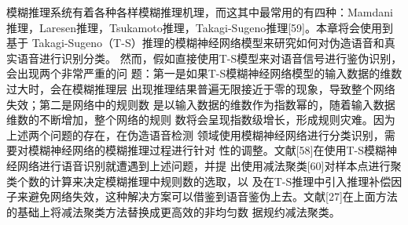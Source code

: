 \documentclass[12pt, a4paper]{article}
\begin{document}
模糊推理系统有着各种各样模糊推理机理，而这其中最常用的有四种：Mamdani
推理，Laresen推理，Tsukamoto推理，Takagi-Sugeno推理[59]。本章将会使用到基于
Takagi-Sugeno（T-S）推理的模糊神经网络模型来研究如何对伪造语音和真实语音进行识别分类。
然而，假如直接使用T-S模型来对语音信号进行鉴伪识别，会出现两个非常严重的问
题：第一是如果T-S模糊神经网络模型的输入数据的维数过大时，会在模糊推理层
出现推理结果普遍无限接近于零的现象，导致整个网络失效；第二是网络中的规则数
是以输入数据的维数作为指数幂的，随着输入数据维数的不断增加，整个网络的规则
数将会呈现指数级增长，形成规则灾难。因为上述两个问题的存在，在伪造语音检测
领域使用模糊神经网络进行分类识别，需要对模糊神经网络的模糊推理过程进行针对
性的调整。文献[58]在使用T-S模糊神经网络进行语音识别就遭遇到上述问题，并提
出使用减法聚类[60]对样本点进行聚类个数的计算来决定模糊推理中规则数的选取，以
及在T-S推理中引入推理补偿因子来避免网络失效，这种解决方案可以借鉴到语音鉴伪上去。文献[27]在上面方法的基础上将减法聚类方法替换成更高效的非均匀数
据规约减法聚类。
\end{document}

